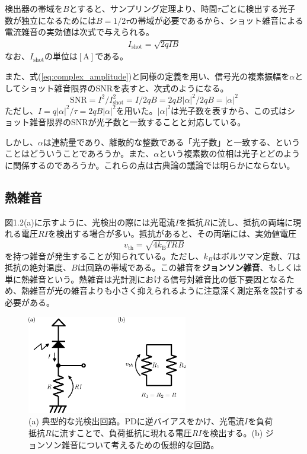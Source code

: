 検出器の帯域を$B$とすると、サンプリング定理より、時間$\tau$ごとに検出する光子数が独立になるためには$B = 1 / 2\tau$の帯域が必要であるから、ショット雑音による電流雑音の実効値は次式で与えられる。
\begin{equation}
	\begin{aligned}
		I_\mathrm{shot}=\sqrt{2qIB}
	\end{aligned}
\end{equation}
なお、$I_\mathrm{shot}$の単位は$\mathrm{[A]}$である。

また、式(\ref{eq:complex_amplitude})と同様の定義を用い、信号光の複素振幅を$\alpha$としてショット雑音限界のSNRを表すと、次式のようになる。
\begin{equation}
  \mathrm{SNR} = I^2 / I_\mathrm{shot}^2 = I/2qB = 2qB|\alpha |^2/2qB = |\alpha|^2
\end{equation}
ただし、$I=q|\alpha|^2/\tau = 2qB|\alpha|^2$を用いた。$|\alpha|^2$は光子数を表すから、この式はショット雑音限界のSNRが光子数と一致することと対応している。

しかし、$\alpha$は連続量であり、離散的な整数である「光子数」と一致する、ということはどういうことであろうか。また、$\alpha$という複素数の位相は光子とどのように関係するのであろうか。これらの点は古典論の議論では明らかにならない。

\subsection{熱雑音}

図1.2(a)に示すように、光検出の際には光電流$I$を抵抗$R$に流し、抵抗の両端に現れる電圧$R I$を検出する場合が多い。抵抗があると、その両端には、実効値電圧
\begin{equation}
	v_\mathrm{th} = \sqrt{4k_\mathrm{B}TRB}
	\label{eq:Johnson_noise}
\end{equation}
を持つ雑音が発生することが知られている。ただし、$k_B$はボルツマン定数、$T$は抵抗の絶対温度、$B$は回路の帯域である。この雑音を\textbf{ジョンソン雑音}、もしくは単に熱雑音という。熱雑音は光計測における信号対雑音比の低下要因となるため、熱雑音が光の雑音よりも小さく抑えられるように注意深く測定系を設計する必要がある。
\begin{figure}
  \centering
  \includegraphics[width=7cm]{fig/1-2_PD_circuit.eps} 
  \caption{(a) 典型的な光検出回路。PDに逆バイアスをかけ、光電流$I$を負荷抵抗$R$に流すことで、負荷抵抗に現れる電圧$RI$を検出する。(b) ジョンソン雑音について考えるための仮想的な回路。}
  \label{fig:photodetector}
\end{figure}

